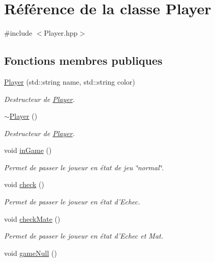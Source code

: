 \hypertarget{class_player}{\section{Référence de la classe Player}
\label{class_player}
}


{\ttfamily \#include $<$Player.\-hpp$>$}

\subsection*{Fonctions membres publiques}
\begin{DoxyCompactItemize}
\item 
\hyperlink{class_player_a06ca07f2ce539e4b458437857a720718}{Player} (std\-::string name, std\-::string color)
\begin{DoxyCompactList}\small\item\em Destructeur de \hyperlink{class_player}{Player}. \end{DoxyCompactList}\item 
\hyperlink{class_player_a749d2c00e1fe0f5c2746f7505a58c062}{$\sim$\-Player} ()
\begin{DoxyCompactList}\small\item\em Destructeur de \hyperlink{class_player}{Player}. \end{DoxyCompactList}\item 
void \hyperlink{class_player_ac587f5febaceec87ddefbaf78f74539d}{in\-Game} ()
\begin{DoxyCompactList}\small\item\em Permet de passer le joueur en état de jeu \char`\"{}normal\char`\"{}. \end{DoxyCompactList}\item 
void \hyperlink{class_player_adf4962f4f2b134085f1e26809cf42680}{check} ()
\begin{DoxyCompactList}\small\item\em Permet de passer le joueur en état d'Echec. \end{DoxyCompactList}\item 
void \hyperlink{class_player_ab9d193b41e8553470f7af7c18abe3ecc}{check\-Mate} ()
\begin{DoxyCompactList}\small\item\em Permet de passer le joueur en état d'Echec et Mat. \end{DoxyCompactList}\item 
void \hyperlink{class_player_ab2f4e51ebb224662fd6e2aac37ed7a05}{game\-Null} ()

\end{DoxyCompactItemize}
